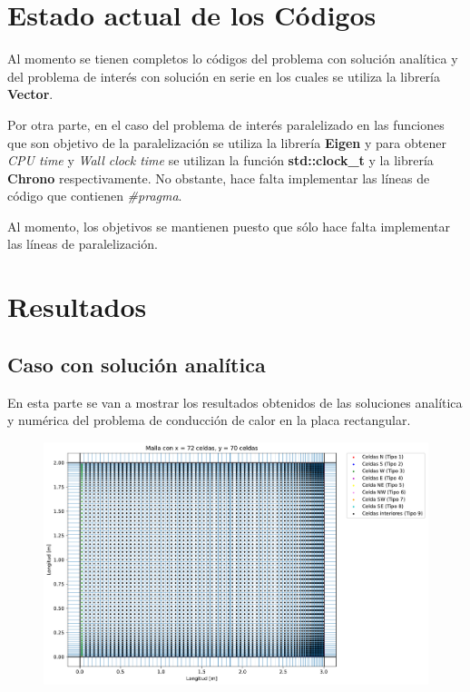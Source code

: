 \documentclass[article,latterpaper]{article}
\begin{document}
\section{Estado actual de los Códigos}
Al momento se tienen completos lo códigos del problema con solución analítica y del problema de interés con solución en serie en los cuales se utiliza la librería \textbf{Vector}.

Por otra parte, en el caso del problema de interés paralelizado en las funciones que son objetivo de la paralelización se utiliza la librería \textbf{Eigen} y para obtener \textit{CPU time} y \textit{Wall clock time} se utilizan la función \textbf{std::clock\_t} y la librería \textbf{Chrono} respectivamente. No obstante, hace falta implementar las líneas de código que contienen \textit{\#pragma}.

Al momento, los objetivos se mantienen puesto que sólo hace falta implementar las líneas de paralelización.

\section{Resultados}
\subsection{Caso con solución analítica}

En esta parte se van a mostrar los resultados obtenidos de las soluciones analítica y numérica del problema de conducción de calor en la placa rectangular.

\begin{figure}[H]
    \centering
    \includegraphics[scale=0.25]{Caso_analitico/Malla.pdf}
    \caption{ }
    \label{Malla_An_num}
\end{figure}
\end{document}
